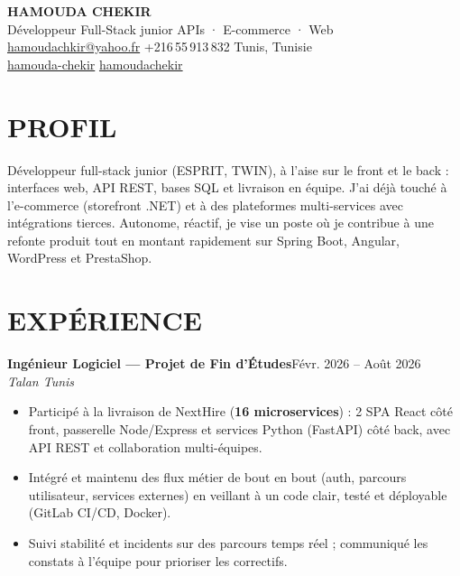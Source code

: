 \documentclass[10pt,a4paper]{article}
\newcommand{\TargetTitle}{Développeur Full-Stack junior \textbar{} APIs · E-commerce · Web}
\newcommand{\job}[3]{%
  \textbf{\color{primary}#1}\hfill{\color{muted}\small #2}\\[-1pt]
  {\color{accent}\textit{#3}}\\[2pt]
  \begin{itemize}[leftmargin=0.85em, itemsep=1pt, topsep=0pt, parsep=0pt, partopsep=0pt]
}
\newcommand{\contactsep}{\hspace{5pt}{\color{rulecolor}|}\hspace{5pt}}
\begin{document}
{\fontsize{22}{26}\selectfont\bfseries\color{primary}HAMOUDA CHEKIR}\\[2pt]
{\large\color{accent}\TargetTitle}\\[4pt]
{\footnotesize\color{muted}%
  \hspace{3pt}\href{mailto:hamoudachkir@yahoo.fr}{hamoudachkir@yahoo.fr}%
  \contactsep
  \hspace{3pt}+216\,55\,913\,832%
  \contactsep
  \hspace{3pt}Tunis, Tunisie%
}\\[2pt]
{\footnotesize\color{muted}%
  \hspace{3pt}\href{https://www.linkedin.com/in/hamouda-chekir-5053572b4}{hamouda-chekir}%
  \contactsep
  \hspace{3pt}\href{https://github.com/hamoudachekir}{hamoudachekir}%
}\\[6pt]

\section{PROFIL}
Développeur full-stack junior (ESPRIT, TWIN), à l'aise sur le front et le back : interfaces web, API REST, bases SQL et livraison en équipe.
J'ai déjà touché à l'e-commerce (storefront .NET) et à des plateformes multi-services avec intégrations tierces. Autonome, réactif, je vise un poste où je contribue à une refonte produit tout en montant rapidement sur Spring Boot, Angular, WordPress et PrestaShop.

\section{EXPÉRIENCE}

\job{Ingénieur Logiciel — Projet de Fin d'Études}{Févr. 2026 -- Août 2026}{Talan \textbar{} Tunis}
  \item Participé à la livraison de NextHire (\textbf{16 microservices}) : 2 SPA React côté front, passerelle Node/Express et services Python (FastAPI) côté back, avec API REST et collaboration multi-équipes.
  \item Intégré et maintenu des flux métier de bout en bout (auth, parcours utilisateur, services externes) en veillant à un code clair, testé et déployable (GitLab CI/CD, Docker).
  \item Suivi stabilité et incidents sur des parcours temps réel ; communiqué les constats à l'équipe pour prioriser les correctifs.
\end{itemize}
\end{document}
